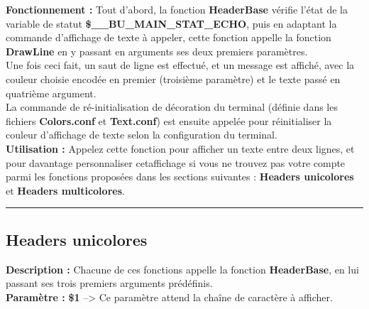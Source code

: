 \documentclass[a4paper,10pt]{article}
\begin{document}
\textbf{Fonctionnement :}\linebreak
Tout d'abord, la fonction \textbf{\color{mauve}HeaderBase\color{white}} vérifie l'état de la variable de statut \textbf{\color{orange}\$\_\_BU\_MAIN\_STAT\_ECHO\color{white}}, puis en adaptant la commande d'affichage de texte à appeler, cette fonction appelle la fonction \textbf{\color{mauve}DrawLine\color{white}} en y passant en arguments ses deux premiers paramètres.\\[1\baselineskip]

Une fois ceci fait, un saut de ligne est effectué, et un message est affiché, avec la couleur choisie\linebreak
encodée en premier (troisième paramètre) et le texte passé en quatrième argument.\\[1\baselineskip]

La commande de ré-initialisation de décoration du terminal (définie dans les fichiers \textbf{\color{lime}Colors.conf\color{white}} et \textbf{\color{lime}Text.conf\color{white}}) est ensuite appelée pour réinitialiser la couleur d'affichage de texte selon la configuration du terminal.\\[1\baselineskip]

\textbf{Utilisation :}\linebreak
Appelez cette fonction pour afficher un texte entre deux lignes, et pour davantage personnaliser cet\linebreak affichage si vous ne trouvez pas votre compte parmi les fonctions proposées dans les sections suivantes :
\textbf{\color{green}Headers unicolores\color{white}} et \textbf{\color{green}Headers multicolores\color{white}}.\\[1\baselineskip]


\color{green}\par\noindent\rule{\textwidth}{0.4pt}\color{white}

\color{green}
\subsection{Headers unicolores}\color{white}
\textbf{Description :}\linebreak
Chacune de ces fonctions appelle la fonction \textbf{\color{mauve}HeaderBase\color{white}}, en lui passant ses trois premiers\linebreak
arguments prédéfinis.\\[1\baselineskip]

\textbf{Paramètre :}\linebreak
\textbf{\color{orange}\$1\color{white}} --> Ce paramètre attend la chaîne de caractère à afficher.\\[1\baselineskip]
\end{document}
